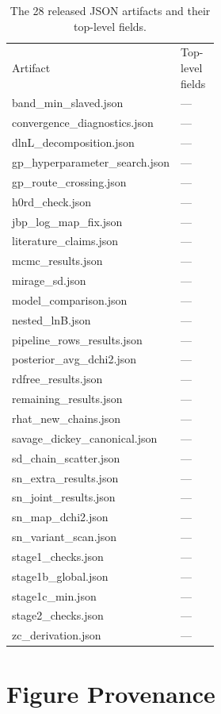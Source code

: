 \documentclass[aps,prd,preprint,superscriptaddress,nofootinbib]{revtex4-2}
\begin{document}
\begin{table}[h]
\caption{The 28 released JSON artifacts and their top-level fields.}
\label{tab:artifacts}
\scriptsize
\begin{ruledtabular}
\begin{tabular}{lp{0.52\linewidth}}
Artifact & Top-level fields \\
\colrule
band\_min\_slaved.json & --- \\
convergence\_diagnostics.json & --- \\
dlnL\_decomposition.json & --- \\
gp\_hyperparameter\_search.json & --- \\
gp\_route\_crossing.json & --- \\
h0rd\_check.json & --- \\
jbp\_log\_map\_fix.json & --- \\
literature\_claims.json & --- \\
mcmc\_results.json & --- \\
mirage\_sd.json & --- \\
model\_comparison.json & --- \\
nested\_lnB.json & --- \\
pipeline\_rows\_results.json & --- \\
posterior\_avg\_dchi2.json & --- \\
rdfree\_results.json & --- \\
remaining\_results.json & --- \\
rhat\_new\_chains.json & --- \\
savage\_dickey\_canonical.json & --- \\
sd\_chain\_scatter.json & --- \\
sn\_extra\_results.json & --- \\
sn\_joint\_results.json & --- \\
sn\_map\_dchi2.json & --- \\
sn\_variant\_scan.json & --- \\
stage1\_checks.json & --- \\
stage1b\_global.json & --- \\
stage1c\_min.json & --- \\
stage2\_checks.json & --- \\
zc\_derivation.json & --- \\
\end{tabular}
\end{ruledtabular}
\end{table}

\section{Figure Provenance}
\label{app:figprov}
\end{document}
